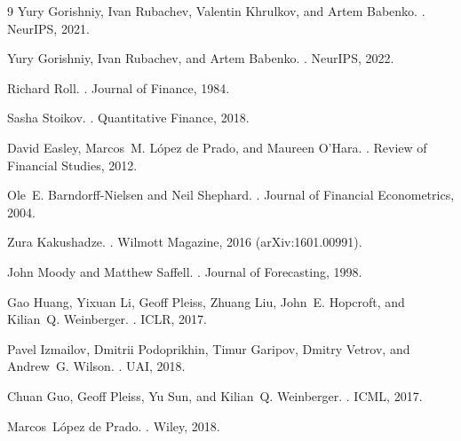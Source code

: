 \documentclass[11pt]{article}
\begin{document}
\begin{thebibliography}{9}
Yury Gorishniy, Ivan Rubachev, Valentin Khrulkov, and Artem Babenko.
.
\newblock NeurIPS, 2021.

Yury Gorishniy, Ivan Rubachev, and Artem Babenko.
.
\newblock NeurIPS, 2022.

Richard Roll.
.
\newblock Journal of Finance, 1984.

Sasha Stoikov.
.
\newblock Quantitative Finance, 2018.

David Easley, Marcos~M. L\'opez de Prado, and Maureen O'Hara.
.
\newblock Review of Financial Studies, 2012.

Ole~E. Barndorff-Nielsen and Neil Shephard.
.
\newblock Journal of Financial Econometrics, 2004.

Zura Kakushadze.
.
\newblock Wilmott Magazine, 2016 (arXiv:1601.00991).

John Moody and Matthew Saffell.
.
\newblock Journal of Forecasting, 1998.

Gao Huang, Yixuan Li, Geoff Pleiss, Zhuang Liu, John~E. Hopcroft, and Kilian~Q. Weinberger.
.
\newblock ICLR, 2017.

Pavel Izmailov, Dmitrii Podoprikhin, Timur Garipov, Dmitry Vetrov, and Andrew~G. Wilson.
.
\newblock UAI, 2018.

Chuan Guo, Geoff Pleiss, Yu Sun, and Kilian~Q. Weinberger.
.
\newblock ICML, 2017.

Marcos~L\'opez de Prado.
.
\newblock Wiley, 2018.

\end{thebibliography}
\end{document}
